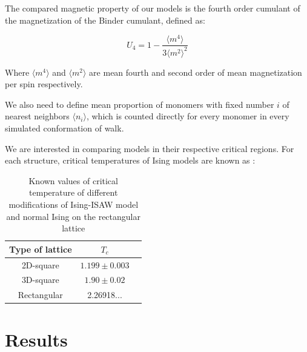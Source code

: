 \documentclass[aps,pre,amssymb,amsmath,twocolumn,floatfix]{revtex4-2}
\begin{document}
The compared magnetic property of our models is the fourth order cumulant of the magnetization of the Binder cumulant, defined as\cite{Selke2006}:

\begin{equation}
\label{eq:Cumulant}
U_{4} = 1 - \frac{\langle m^{4} \rangle}{3 \langle m^{2} \rangle^{2}}
\end{equation}

Where $\langle m^{4} \rangle$ and $\langle m^{2} \rangle$ are mean fourth and second order of mean magnetization per spin respectively.

We also need to define mean proportion of monomers with fixed number $i$ of nearest neighbors $\langle n_{i} \rangle$, which is counted directly for every monomer in every simulated conformation of walk.

We are interested in comparing models in their respective critical regions. For each structure, critical temperatures of Ising models are known as \cite{Foster2021,Selke2006}:

\begin{table}[h]
    \centering
    \begin{tabular}{|c|c|c|}
        \hline
        Type of lattice & $T_{c}$ \\ \hline
        2D-square & $1.199 \pm 0.003$\cite{Foster2021} \\ \hline
        3D-square & $1.90 \pm 0.02$\cite{Foster2021}\\ \hline
        Rectangular & 2.26918...\cite{Selke2006}\\ \hline
    \end{tabular}
    \caption{Known values of critical temperature of different modifications of Ising-ISAW model and normal Ising on the rectangular lattice}
    \label{tab:Ising_T_c}
\end{table}





\section{Results}
\end{document}
